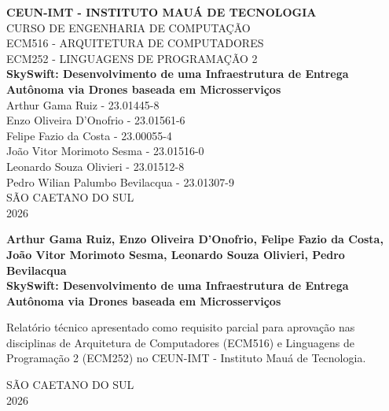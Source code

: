 \documentclass[12pt,a4paper]{article}
\begin{document}
\begin{titlepage}
    \begin{center}
        {\large \textbf{CEUN-IMT - INSTITUTO MAUÁ DE TECNOLOGIA}} \\
        \vspace{0.5cm}
        {\large CURSO DE ENGENHARIA DE COMPUTAÇÃO} \\
        \vspace{0.5cm}
        {\large ECM516 - ARQUITETURA DE COMPUTADORES} \\
        {\large ECM252 - LINGUAGENS DE PROGRAMAÇÃO 2} \\
        \vfill
        {\Large \textbf{SkySwift: Desenvolvimento de uma Infraestrutura de Entrega Autônoma via Drones baseada em Microsserviços}} \\
        \vfill
        {\large Arthur Gama Ruiz - 23.01445-8} \\
        {\large Enzo Oliveira D’Onofrio - 23.01561-6} \\
        {\large Felipe Fazio da Costa - 23.00055-4} \\
        {\large João Vitor Morimoto Sesma - 23.01516-0} \\
        {\large Leonardo Souza Olivieri - 23.01512-8} \\
        {\large Pedro Wilian Palumbo Bevilacqua - 23.01307-9} \\
        \vfill
        {\large SÃO CAETANO DO SUL} \\
        {\large 2026}
    \end{center}
\end{titlepage}

\newpage
\begin{center}
    {\large \textbf{Arthur Gama Ruiz, Enzo Oliveira D’Onofrio, Felipe Fazio da Costa, \\ João Vitor Morimoto Sesma, Leonardo Souza Olivieri, Pedro Bevilacqua}} \\
    \vfill
    {\Large \textbf{SkySwift: Desenvolvimento de uma Infraestrutura de Entrega Autônoma via Drones baseada em Microsserviços}} \\
    \vfill
    \hspace{.45\textwidth}
    \begin{minipage}{.5\textwidth}
        Relatório técnico apresentado como requisito parcial para aprovação nas disciplinas de Arquitetura de Computadores (ECM516) e Linguagens de Programação 2 (ECM252) no CEUN-IMT - Instituto Mauá de Tecnologia.
    \end{minipage}
    \vfill
    {\large SÃO CAETANO DO SUL} \\
    {\large 2026}
\end{center}
\end{document}

